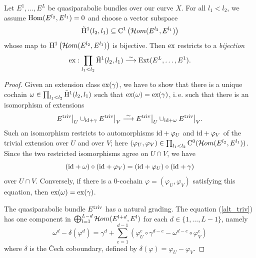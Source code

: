 \documentclass{article}
\begin{document}
\begin{thm} \label{extthm}
  Let $E^1, \ldots, E^L$ be quasiparabolic bundles over our curve $X$. For all $l_1 < l_2$, we assume $\Hom( E^{l_2}, E^{l_1}) = 0$ and choose a vector
  subspace
  \begin{displaymath}
    \tilde{\cohom}^1( l_2, l_1) \subseteq \chains^1 \left( \Homsheaf(E^{l_2}, E^{l_1}) \right)
  \end{displaymath}
  whose map to $\cohom^1 \left( \Homsheaf(E^{l_2}, E^{l_1}) \right)$ is bijective. Then $\ex$ restricts to a \emph{bijection}
  \begin{displaymath}
    \ex: \prod_{l_1 < l_2} \tilde{\cohom}^1( l_2, l_1) \longto[\sim] \Ext( E^L, \ldots, E^1).
  \end{displaymath}
\end{thm}
\begin{proof}
  Given an extension class $\ex(\gamma)$, we have to show that there is a unique cochain $\omega \in \prod_{l_1 < l_2} \tilde{\cohom}^1( l_2, l_1)$ such
  that $\ex(\omega) = \ex(\gamma)$, i.\,e. such that there is an isomorphism of extensions
  \begin{displaymath}
    E^{\triv} \big|_U \cup_{\id + \gamma} E^{\triv} \big|_V \longto[\sim] E^{\triv} \big|_U \cup_{\id + \omega} E^{\triv} \big|_V.
  \end{displaymath}
  Such an isomorphism restricts to automorphisms $\id + \varphi_U$ and $\id + \varphi_V$ of the trivial extension over $U$ and over $V$; here $(\varphi_U,
  \varphi_V) \in \prod_{l_1 < l_2} \chains^0 ( \Homsheaf(E^{l_2}, E^{l_1}) )$. Since the two restricted isomorphisms agree on $U \cap V$, we have
  \begin{equation} \label{alt_triv}
    (\id + \omega) \circ (\id + \varphi_V) = (\id + \varphi_U) \circ (\id + \gamma)
  \end{equation}
  over $U \cap V$. Conversely, if there is a 0-cochain $\varphi = (\varphi_U, \varphi_V)$ satisfying this equation, then $\ex(\omega) = \ex(\gamma)$.

  The quasiparabolic bundle $E^{\triv}$ has a natural grading. The equation (\ref{alt_triv}) has one component in
  $\bigoplus_{l=1}^{L-d} \Homsheaf( E^{l+d}, E^l)$ for each $d \in \{1, \ldots, L-1\}$, namely
  \begin{equation} \label{deg_d}
    \omega^d - \delta (\varphi^d) = \gamma^d + \sum_{e=1}^{d-1}
      \left( \varphi_U^e \circ \gamma^{d-e} - \omega^{d-e} \circ \varphi_V^e \right)
  \end{equation}
  where $\delta$ is the \v{C}ech coboundary, defined by $\delta(\varphi) = \varphi_U - \varphi_V$.


\end{proof}
\end{document}
